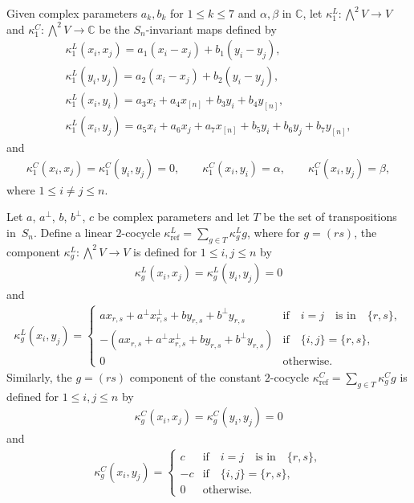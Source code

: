 \documentclass[10pt,a4paper]{amsart}
\numberwithin{equation}{section}
\newcommand{\n}[1]{{#1}_{[n]}}
\DeclareMathOperator{\refl}{ref}
\begin{document}
\begin{Definition}\label{def:kappa1}
Given complex parameters $a_k, b_k$ for $1 \leq k \leq 7$ and $\alpha, \beta$ in $\mathbb{C}$,
let $\kappa^L_1\colon \bigwedge^2 V \to V$ and
$\kappa^C_1\colon \bigwedge^2 V\to \mathbb{C}$
be the $S_n$-invariant maps defined by
\begin{gather}
\label{kappaLxx}
\kappa^L_1(x_i,x_j)=a_1(x_i-x_j)+b_1(y_i-y_j), \\
\label{kappaLyy}
\kappa^L_1(y_i,y_j)=a_2(x_i-x_j)+b_2(y_i-y_j), \\
\label{kappaLxiyi}
\kappa^L_1(x_i,y_i)=a_3x_i+a_4\n{x}+b_3y_i+b_4\n{y}, \\
\label{kappaLxiyj}
\kappa^L_1(x_i,y_j)=a_5x_i+a_6x_j+a_7\n{x}+b_5y_i+b_6y_j+b_7\n{y},
\end{gather}
and
\begin{gather*}
\kappa^C_1(x_i,x_j)=\kappa^C_1(y_i,y_j)=0, \qquad \kappa^C_1(x_i,y_i)=\alpha, \qquad \kappa^C_1(x_i,y_j)=\beta,
\end{gather*}
where $1 \leq i \neq j \leq n$.
\end{Definition}


\begin{Definition}\label{def:kapparefl}
Let $a$, $a^\perp$, $b$, $b^\perp$, $c$ be complex parameters and let $T$ be the set of transpositions in~$S_n$.
Define a linear $2$-cocycle $\kappa^L_{\refl}=\sum_{g\in T}\kappa_g^Lg$, where for $g=(rs)$, the component $\kappa_g^L\colon \bigwedge^2 V\to V$ is defined for $1\leq i, j\leq n$ by
\begin{gather*}
\kappa_g^L(x_i,x_j)=\kappa_g^L(y_i,y_j)=0
\end{gather*}
and
\begin{gather*}
\kappa_g^L(x_i,y_j)=\begin{cases}
 ax_{r,s}+a^{\perp}x_{r,s}^{\perp}+by_{r,s}+b^{\perp}y_{r,s} & \text{if}\quad i=j\quad \text{is in}\quad \{r,s\},
 \\
 -(ax_{r,s}+a^{\perp}x_{r,s}^{\perp}+by_{r,s}+b^{\perp}y_{r,s}) & \text{if}\quad \{i,j\}=\{r,s\},
 \\
 0 & \text{otherwise.}
\end{cases}
\end{gather*}
Similarly, the $g=(rs)$ component of the constant $2$-cocycle $\kappa^C_{\refl}=\sum_{g\in T}\kappa_g^Cg$ is defined for $1\leq i, j\leq n$ by
\begin{gather*}
\kappa_g^C(x_i,x_j)=\kappa_g^C(y_i,y_j)=0
\end{gather*}
and
\begin{gather*}
\kappa_g^C(x_i,y_j)=\begin{cases}
c & \text{if}\quad i=j\quad \text{is in}\quad \{r,s\},
\\
-c & \text{if}\quad \{i,j\}=\{r,s\},
 \\
0 & \text{otherwise}.
\end{cases}
\end{gather*}
\end{Definition}
\end{document}
